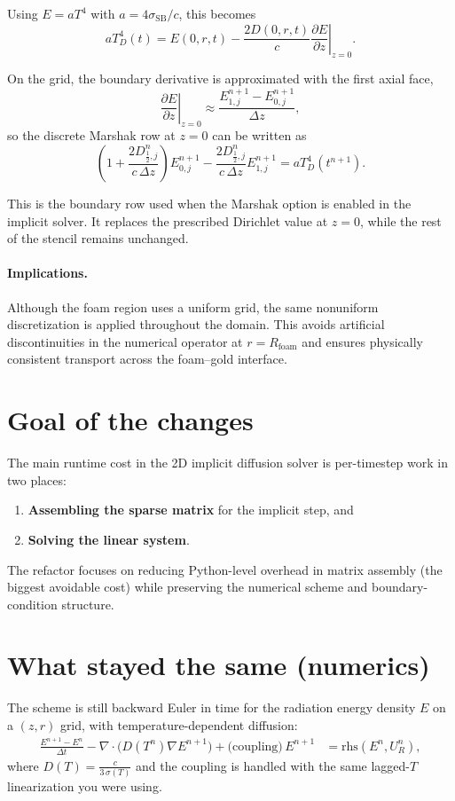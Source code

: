 \documentclass[11pt]{article}
\begin{document}
Using $E=aT^4$ with $a=4\sigma_{\mathrm{SB}}/c$, this becomes
\begin{equation}
aT_D^4(t)
=
E(0,r,t)
-
\frac{2D(0,r,t)}{c}
\left.\frac{\partial E}{\partial z}\right|_{z=0}.
\end{equation}

On the grid, the boundary derivative is approximated with the first axial face,
\begin{equation}
\left.\frac{\partial E}{\partial z}\right|_{z=0}
\approx
\frac{E^{n+1}_{1,j}-E^{n+1}_{0,j}}{\Delta z},
\end{equation}
so the discrete Marshak row at $z=0$ can be written as
\begin{equation}
\left(
1 + \frac{2D^n_{\frac12,j}}{c\,\Delta z}
\right)E^{n+1}_{0,j}
-
\frac{2D^n_{\frac12,j}}{c\,\Delta z}E^{n+1}_{1,j}
=
aT_D^4(t^{n+1}).
\end{equation}

This is the boundary row used when the Marshak option is enabled in the implicit
solver. It replaces the prescribed Dirichlet value at $z=0$, while the rest of the
stencil remains unchanged.

\paragraph{Implications.}
Although the foam region uses a uniform grid, the same nonuniform discretization
is applied throughout the domain. This avoids artificial discontinuities in the
numerical operator at $r=R_{\mathrm{foam}}$ and ensures physically consistent
transport across the foam--gold interface.


\section*{Goal of the changes}
The main runtime cost in the 2D implicit diffusion solver is per-timestep work in two places:
\begin{enumerate}
  \item \textbf{Assembling the sparse matrix} for the implicit step, and
  \item \textbf{Solving the linear system}.
\end{enumerate}

The refactor focuses on reducing Python-level overhead in matrix assembly (the biggest avoidable cost) while preserving the numerical scheme and boundary-condition structure.

\section*{What stayed the same (numerics)}
The scheme is still backward Euler in time for the radiation energy density $E$ on a $(z,r)$ grid, with temperature-dependent diffusion:
\begin{align}
  \frac{E^{n+1}-E^n}{\Delta t} - \nabla\cdot\bigl(D(T^n)\nabla E^{n+1}\bigr) + \text{(coupling)}\,E^{n+1} &= \text{rhs}(E^n, U_R^n),
\end{align}
where $D(T)=\frac{c}{3\,\sigma(T)}$ and the coupling is handled with the same lagged-$T$ linearization you were using.
\end{document}
